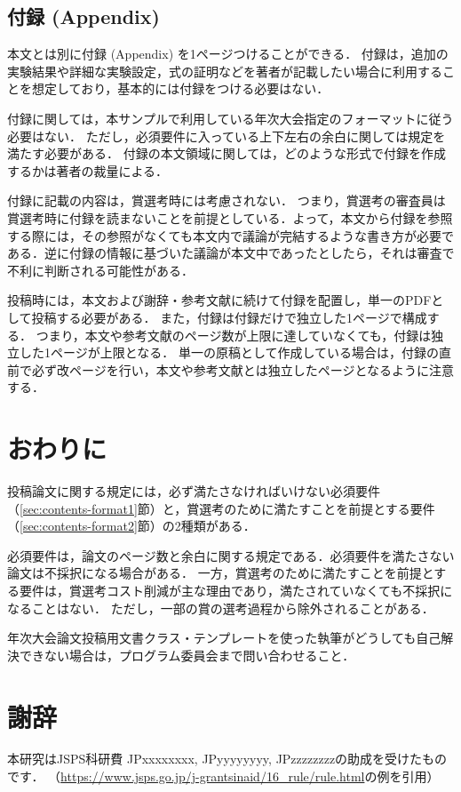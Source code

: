 \documentclass[
  platex, dvipdfmx,  %
]{nlp2024}
\begin{document}
\subsection{付録 (Appendix)}
\label{sec:appendix}
本文とは別に付録 (Appendix) を1ページつけることができる．
付録は，追加の実験結果や詳細な実験設定，式の証明などを著者が記載したい場合に利用することを想定しており，基本的には付録をつける必要はない．

付録に関しては，本サンプルで利用している年次大会指定のフォーマットに従う必要はない．
ただし，必須要件に入っている上下左右の余白に関しては規定を満たす必要がある．
付録の本文領域に関しては，どのような形式で付録を作成するかは著者の裁量による．

付録に記載の内容は，賞選考時には考慮されない．
つまり，賞選考の審査員は賞選考時に付録を読まないことを前提としている．よって，本文から付録を参照する際には，その参照がなくても本文内で議論が完結するような書き方が必要である．逆に付録の情報に基づいた議論が本文中であったとしたら，それは審査で不利に判断される可能性がある．



投稿時には，本文および謝辞・参考文献に続けて付録を配置し，単一のPDFとして投稿する必要がある．
また，付録は付録だけで独立した1ページで構成する．
つまり，本文や参考文献のページ数が上限に達していなくても，付録は独立した1ページが上限となる．
単一の原稿として作成している場合は，付録の直前で必ず改ページを行い，本文や参考文献とは独立したページとなるように注意する．


\section{おわりに}
投稿論文に関する規定には，必ず満たさなければいけない必須要件（\ref{sec:contents-format1}節）と，賞選考のために満たすことを前提とする要件（\ref{sec:contents-format2}節）の2種類がある．

必須要件は，論文のページ数と余白に関する規定である．必須要件を満たさない論文は不採択になる場合がある．
一方，賞選考のために満たすことを前提とする要件は，賞選考コスト削減が主な理由であり，満たされていなくても不採択になることはない．
ただし，一部の賞の選考過程から除外されることがある．

年次大会論文投稿用文書クラス・テンプレートを使った執筆がどうしても自己解決できない場合は，プログラム委員会まで問い合わせること．





\newpage
\section*{謝辞}
本研究はJSPS科研費 JPxxxxxxxx, JPyyyyyyyy, JPzzzzzzzzの助成を受けたものです．
（\url{https://www.jsps.go.jp/j-grantsinaid/16_rule/rule.html}の例を引用）
\end{document}
